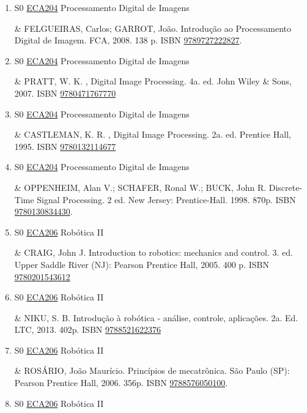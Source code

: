 \documentclass[12pt,a4paper]{book}
\begin{document}
\begin{enumerate}
 

 \item S0 \hyperref[PUD:ECA204]{ECA204} Processamento Digital de Imagens

&   FELGUEIRAS, Carlos;  GARROT, João.  Introdução ao Processamento Digital de Imagem.  FCA, 2008.  138 p.  ISBN \href{http://www.google.com/search?hl=pt-BR&tbo=p&tbm=bks&q=isbn:9789727222827&num=10}{9789727222827}.
 \item S0 \hyperref[PUD:ECA204]{ECA204} Processamento Digital de Imagens

&   PRATT, W. K. , Digital Image Processing.  4a. ed.  John Wiley \& Sons, 2007.  ISBN \href{http://www.isbnsearch.org/isbn/9780471767770}{9780471767770}

 

 \item S0 \hyperref[PUD:ECA204]{ECA204} Processamento Digital de Imagens

&   CASTLEMAN, K. R. , Digital Image Processing.  2a.  ed.  Prentice Hall, 1995.  ISBN \href{http://www.isbnsearch.org/isbn/9780132114677}{9780132114677}

 

 \item S0 \hyperref[PUD:ECA204]{ECA204} Processamento Digital de Imagens

& OPPENHEIM, Alan V.;  SCHAFER, Ronal W.;  BUCK, John R.  Discrete-Time Signal Processing.  2 ed.  New Jersey: Prentice-Hall.  1998.  870p.  ISBN \href{http://www.isbnsearch.org/isbn/9780130834430}{9780130834430}.
 \item S0 \hyperref[PUD:ECA206]{ECA206} Robótica II

&  CRAIG, John J.  Introduction to robotics: mechanics and control.  3. ed.  Upper Saddle River (NJ): Pearson Prentice Hall, 2005.  400 p.  ISBN \href{http://www.isbnsearch.org/isbn/9780201543612}{9780201543612}
 

 \item S0 \hyperref[PUD:ECA206]{ECA206} Robótica II

&   NIKU, S.  B.  Introdução à robótica - análise, controle, aplicações.  2a.  Ed.  LTC, 2013.  402p.  ISBN \href{http://www.bn.br/site/pages/servicosProfissionais/agenciaISBN/isbnBusca/FbnBuscaISBNCatalogo.asp?pField=ISBN&pIntPagina=1&pISBN=21622376&nidbISBN=true&hidbISBN=true}{9788521622376}
 

 \item S0 \hyperref[PUD:ECA206]{ECA206} Robótica II

&  ROSÁRIO, João Maurício.  Princípios de mecatrônica.  São Paulo (SP): Pearson Prentice Hall, 2006.  356p.  ISBN \href{http://www.bn.br/site/pages/servicosProfissionais/agenciaISBN/isbnBusca/FbnBuscaISBNCatalogo.asp?pField=ISBN&pIntPagina=1&pISBN=76050100&nidbISBN=true&hidbISBN=true}{9788576050100}.
 \item S0 \hyperref[PUD:ECA206]{ECA206} Robótica II


\end{enumerate}
\end{document}
